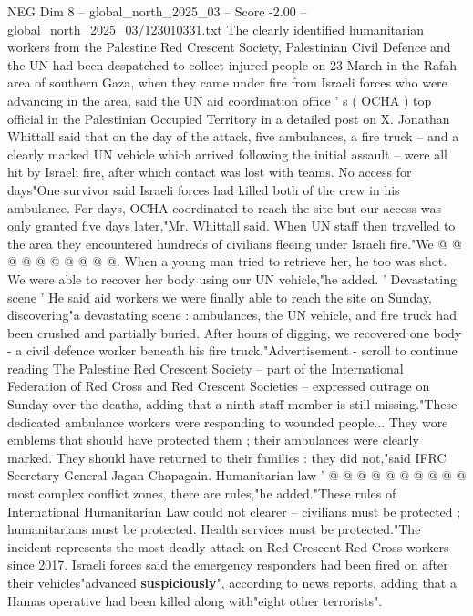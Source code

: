 \begin{textsample}{NEG Dim 8 – global\_north\_2025\_03 – Score -2.00 – global\_north\_2025\_03/123010331.txt}  \label{ex:f8_neg_121}
The clearly identified humanitarian workers from the Palestine Red Crescent Society, Palestinian Civil Defence and the UN had been despatched to collect injured people on 23 March in the Rafah area of southern Gaza, when they came under fire from Israeli forces who were advancing in the area, said the UN aid coordination office ' s ( OCHA ) top official in the Palestinian Occupied Territory in a detailed post on X.
Jonathan Whittall said that on the day of the attack, five ambulances, a fire truck -- and a clearly marked UN vehicle which arrived following the initial assault -- were all hit by Israeli fire, after which contact was lost with teams.
No access for days"One survivor said Israeli forces had killed both of the crew in his ambulance.
For days, OCHA coordinated to reach the site but our access was only granted five days later,"Mr.
Whittall said.
When UN staff then travelled to the area they encountered hundreds of civilians fleeing under Israeli fire."We @ @ @ @ @ @ @ @ @ @.
When a young man tried to retrieve her, he too was shot.
We were able to recover her body using our UN vehicle,"he added. ' Devastating scene ' He said aid workers we were finally able to reach the site on Sunday, discovering"a devastating scene : ambulances, the UN vehicle, and fire truck had been crushed and partially buried.
After hours of digging, we recovered one body - a civil defence worker beneath his fire truck."Advertisement - scroll to continue reading The Palestine Red Crescent Society -- part of the International Federation of Red Cross and Red Crescent Societies -- expressed outrage on Sunday over the deaths, adding that a ninth staff member is still missing."These dedicated ambulance workers were responding to wounded people...
They wore emblems that should have protected them ; their ambulances were clearly marked.
They should have returned to their families : they did not,"said IFRC Secretary General Jagan Chapagain.
Humanitarian law ' @ @ @ @ @ @ @ @ @ @ most complex conflict zones, there are rules,"he added."These rules of International Humanitarian Law could not clearer -- civilians must be protected ; humanitarians must be protected.
Health services must be protected."The incident represents the most deadly attack on Red Crescent Red Cross workers since 2017.
Israeli forces said the emergency responders had been fired on after their vehicles"advanced \textbf{suspiciously}", according to news reports, adding that a Hamas operative had been killed along with"eight other terrorists".

\end{textsample}
